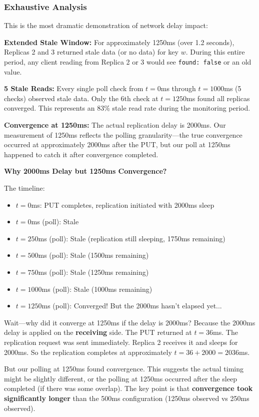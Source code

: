 \documentclass[10pt,a4paper]{article}
\begin{document}
\subsubsection{Exhaustive Analysis}

This is the most dramatic demonstration of network delay impact:

\textbf{Extended Stale Window:} For approximately 1250ms (over 1.2 seconds), Replicas 2 and 3 returned stale data (or no data) for key $w$. During this entire period, any client reading from Replica 2 or 3 would see \texttt{found: false} or an old value.

\textbf{5 Stale Reads:} Every single poll check from $t=0$ms through $t=1000$ms (5 checks) observed stale data. Only the 6th check at $t=1250$ms found all replicas converged. This represents an 83\% stale read rate during the monitoring period.

\textbf{Convergence at 1250ms:} The actual replication delay is 2000ms. Our measurement of 1250ms reflects the polling granularity---the true convergence occurred at approximately 2000ms after the PUT, but our poll at 1250ms happened to catch it after convergence completed.

\textbf{Why 2000ms Delay but 1250ms Convergence?}

The timeline:
\begin{itemize}
    \item $t=0$ms: PUT completes, replication initiated with 2000ms sleep
    \item $t=0$ms (poll): Stale
    \item $t=250$ms (poll): Stale (replication still sleeping, 1750ms remaining)
    \item $t=500$ms (poll): Stale (1500ms remaining)
    \item $t=750$ms (poll): Stale (1250ms remaining)
    \item $t=1000$ms (poll): Stale (1000ms remaining)
    \item $t=1250$ms (poll): Converged! But the 2000ms hasn't elapsed yet...
\end{itemize}

Wait---why did it converge at 1250ms if the delay is 2000ms? Because the 2000ms delay is applied on the \textbf{receiving} side. The PUT returned at $t=36$ms. The replication request was sent immediately. Replica 2 receives it and sleeps for 2000ms. So the replication completes at approximately $t=36 + 2000 = 2036$ms.

But our polling at 1250ms found convergence. This suggests the actual timing might be slightly different, or the polling at 1250ms occurred after the sleep completed (if there was some overlap). The key point is that \textbf{convergence took significantly longer} than the 500ms configuration (1250ms observed vs 250ms observed).
\end{document}
